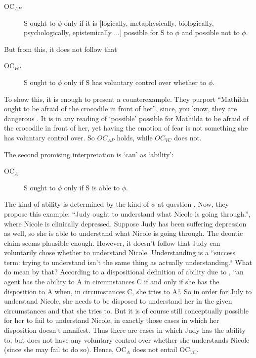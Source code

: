 \documentclass[12pt,numbers=noenddot]{scrartcl}
\begin{document}
 \begin{description}
    \item[OC$_{AP}$] S ought to $\phi$ only if it is [logically, metaphysically, biologically, psychologically, epistemically ...] possible for S to $\phi$ and possible not to $\phi$.
 \end{description}

But from this, it does not follow that
\begin{description}
    \item[OC$_{VC}$] S ought to $\phi$ only if S has voluntary control over whether to $\phi$.
 \end{description}

 To show this, it is enough to present a counterexample. They purport “Mathilda ought to be afraid of the crocodile in front of her”, since, you know, they are dangerous \autocite[616]{Chuard2009-CHUENW}. It is in any reading of ‘possible’ possible for Mathilda to be afraid of the crocodile in front of her, yet having the emotion of fear is not something she has voluntary control over. So $OC_{AP}$ holds, while $OC_{VC}$ does not.

 The second promising interpretation is ‘can’ as ‘ability’:

 \begin{description}
    \item[OC$_{A}$] S ought to $\phi$ only if S is able to $\phi$.
 \end{description}

 The kind of ability is determined by the kind of $\phi$ at question \autocite[617]{Chuard2009-CHUENW}. Now, they propose this example: “Judy ought to understand what Nicole is going through.”, where Nicole is clinically depressed. Suppose Judy has been suffering depression as well, so she is able to understand what Nicole is going through. The deontic claim seems plausible enough. However, it doesn't follow that Judy can voluntarily chose whether to understand Nicole. Understanding is a “success term: trying to understand isn’t the same thing as actually understanding.“ What do \textcite[617]{Chuard2009-CHUENW} mean by that? According to a dispositional definition of ability due to \textcite[848]{Fara2008-FARMAA}, “an agent has the ability to A in circumstances C if and only if she has the disposition to A when, in circumstances C, she tries to A“. So in order for July to understand Nicole, she needs to be disposed to understand her in the given circumstances and that she tries to. But it is of course still conceptually possible for her to fail to understand Nicole, in exactly those cases in which her disposition doesn't manifest. Thus there are cases in which Judy has the ability to, but does not have any voluntary control over whether she understands Nicole (since she may fail to do so). Hence, OC$_A$ does not entail OC$_{VC}$.
\end{document}
